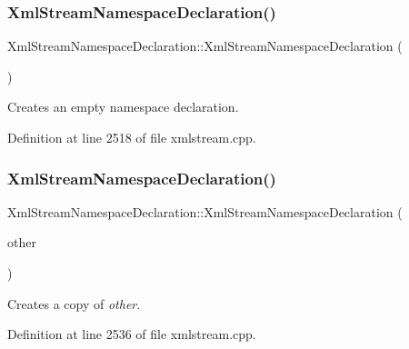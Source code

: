 \subsubsection{\texorpdfstring{Xml\+Stream\+Namespace\+Declaration()}{XmlStreamNamespaceDeclaration()}\hspace{0.1cm}{\footnotesize\ttfamily [1/3]}}
{\footnotesize\ttfamily Xml\+Stream\+Namespace\+Declaration\+::\+Xml\+Stream\+Namespace\+Declaration (\begin{DoxyParamCaption}{ }\end{DoxyParamCaption})}

Creates an empty namespace declaration. 

Definition at line 2518 of file xmlstream.\+cpp.

\mbox{\label{class_xml_stream_namespace_declaration_a438efeeca364b3003ef2ef16d45d9d22}} 
\subsubsection{\texorpdfstring{Xml\+Stream\+Namespace\+Declaration()}{XmlStreamNamespaceDeclaration()}\hspace{0.1cm}{\footnotesize\ttfamily [2/3]}}
{\footnotesize\ttfamily Xml\+Stream\+Namespace\+Declaration\+::\+Xml\+Stream\+Namespace\+Declaration (\begin{DoxyParamCaption}\item[{const \hyperlink{class_xml_stream_namespace_declaration}{Xml\+Stream\+Namespace\+Declaration} \&}]{other }\end{DoxyParamCaption})}

Creates a copy of {\itshape other}. 

Definition at line 2536 of file xmlstream.\+cpp.

\mbox{\label{class_xml_stream_namespace_declaration_af7284ccda394915ac5a1a8bd2c80c064}} 
